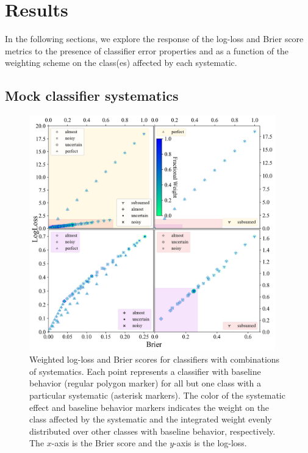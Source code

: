 \section{Results}
\label{sec:results}

In the following sections, we explore the response of the log-loss and Brier score metrics to the presence of classifier error properties and as a function of the weighting scheme on the class(es) affected by each systematic.

\subsection{Mock classifier systematics}
\label{sec:mockresults}

\begin{figure}
	\begin{center}
		\includegraphics[width=0.95\textwidth]{./fig/multipanel_res.png}
		\caption{Weighted log-loss and Brier scores for classifiers with combinations of systematics.
		Each point represents a classifier with baseline behavior (regular polygon marker) for all but one class with a particular systematic (asterisk markers).
		The color of the systematic effect and baseline behavior markers indicates the weight on the class affected by the systematic and the integrated weight evenly distributed over other classes with baseline behavior, respectively.
		The $x$-axis is the Brier score and the $y$-axis is the log-loss.
		}
	\end{center}
	\label{fig:all_combined}
\end{figure}

